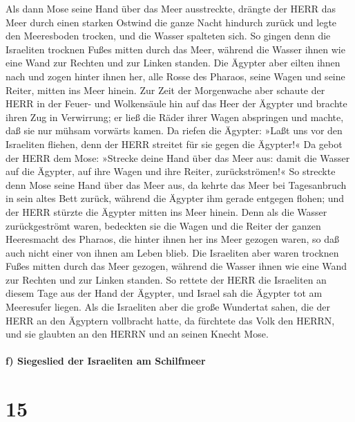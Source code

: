  Als dann Mose seine Hand über das Meer ausstreckte,
drängte der HERR das Meer durch einen starken Ostwind die ganze Nacht
hindurch zurück und legte den Meeresboden trocken, und die Wasser
spalteten sich.  So gingen denn die Israeliten trocknen
Fußes mitten durch das Meer, während die Wasser ihnen wie eine Wand zur
Rechten und zur Linken standen.  Die Ägypter aber eilten
ihnen nach und zogen hinter ihnen her, alle Rosse des Pharaos, seine
Wagen und seine Reiter, mitten ins Meer hinein.  Zur Zeit
der Morgenwache aber schaute der HERR in der Feuer- und Wolkensäule hin
auf das Heer der Ägypter und brachte ihren Zug in Verwirrung;
 er ließ die Räder ihrer Wagen abspringen und machte, daß
sie nur mühsam vorwärts kamen. Da riefen die Ägypter: »Laßt uns vor den
Israeliten fliehen, denn der HERR streitet für sie gegen die Ägypter!«
 Da gebot der HERR dem Mose: »Strecke deine Hand über das
Meer aus: damit die Wasser auf die Ägypter, auf ihre Wagen und ihre
Reiter, zurückströmen!«  So streckte denn Mose seine Hand
über das Meer aus, da kehrte das Meer bei Tagesanbruch in sein altes
Bett zurück, während die Ägypter ihm gerade entgegen flohen; und der
HERR stürzte die Ägypter mitten ins Meer hinein.  Denn
als die Wasser zurückgeströmt waren, bedeckten sie die Wagen und die
Reiter der ganzen Heeresmacht des Pharaos, die hinter ihnen her ins Meer
gezogen waren, so daß auch nicht einer von ihnen am Leben blieb.
 Die Israeliten aber waren trocknen Fußes mitten durch
das Meer gezogen, während die Wasser ihnen wie eine Wand zur Rechten und
zur Linken standen.  So rettete der HERR die Israeliten
an diesem Tage aus der Hand der Ägypter, und Israel sah die Ägypter tot
am Meeresufer liegen.  Als die Israeliten aber die große
Wundertat sahen, die der HERR an den Ägyptern vollbracht hatte, da
fürchtete das Volk den HERRN, und sie glaubten an den HERRN und an
seinen Knecht Mose.

\hypertarget{f-siegeslied-der-israeliten-am-schilfmeer}{%
\paragraph{f) Siegeslied der Israeliten am
Schilfmeer}\label{f-siegeslied-der-israeliten-am-schilfmeer}}

\hypertarget{section-14}{%
\section{15}\label{section-14}}

